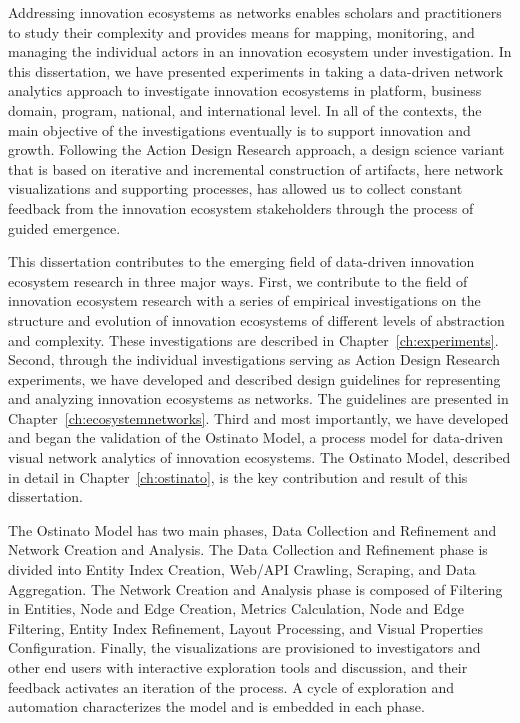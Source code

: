Addressing innovation ecosystems as networks enables scholars and practitioners to study their complexity and provides means for mapping, monitoring, and managing the individual actors in an innovation ecosystem under investigation. In this dissertation, we have presented experiments in taking a data-driven network analytics approach to investigate innovation ecosystems in platform, business domain, program, national, and international level. In all of the contexts, the main objective of the investigations eventually is to support innovation and growth. Following the Action Design Research approach, a design science variant that is based on iterative and incremental construction of artifacts, here network visualizations and supporting processes, has allowed us to collect constant feedback from the innovation ecosystem stakeholders through the process of guided emergence.

This dissertation contributes to the emerging field of data-driven innovation ecosystem research in three major ways. First, we contribute to the field of innovation ecosystem research with a series of empirical investigations on the structure and evolution of innovation ecosystems of different levels of abstraction and complexity. These investigations are described in Chapter~\ref{ch:experiments}. Second, through the individual investigations serving as Action Design Research experiments, we have developed and described design guidelines for representing and analyzing innovation ecosystems as networks. The guidelines are presented in Chapter~\ref{ch:ecosystemnetworks}. Third and most importantly, we have developed and began the validation of the Ostinato Model, a process model for data-driven visual network analytics of innovation ecosystems. The Ostinato Model, described in detail in Chapter~\ref{ch:ostinato}, is the key contribution and result of this dissertation.

The Ostinato Model has two main phases, Data Collection and Refinement and Network Creation and Analysis. The Data Collection and Refinement phase is divided into Entity Index Creation, Web/API Crawling, Scraping, and Data Aggregation. The Network Creation and Analysis phase is composed of Filtering in Entities, Node and Edge Creation, Metrics Calculation, Node and Edge Filtering, Entity Index Refinement, Layout Processing, and Visual Properties Configuration. Finally, the visualizations are provisioned to investigators and other end users with interactive exploration tools and discussion, and their feedback activates an iteration of the process. A cycle of exploration and automation characterizes the model and is embedded in each phase.

